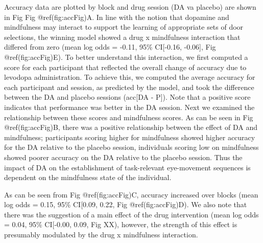 \documentclass{article}
\begin{document}
Accuracy data are plotted by block and drug session (DA va placebo) are
shown in Fig Fig @ref(fig:accFig)A. In line with the notion that
dopamine and mindfulness may interact to support the learning of
appropriate sets of door selections, the winning model showed a drug x
mindfulness interaction that differed from zero (mean log odds = -0.11,
95\% CI{[}-0.16, -0.06{]}, Fig @ref(fig:accFig)E). To better understand
this interaction, we first computed a score for each participant that
reflected the overall change of accuracy due to levodopa administration.
To achieve this, we computed the average accuracy for each participant
and session, as predicted by the model, and took the difference between
the DA and placebo sessions (acc{[}DA - P{]}). Note that a positive
score indicates that performance was better in the DA session. Next we
examined the relationship between these scores and mindfulness scores.
As can be seen in Fig @ref(fig:accFig)B, there was a positive
relationship between the effect of DA and mindfulness; participants
scoring higher for mindfulness showed higher accuracy for the DA
relative to the placebo session, individuals scoring low on mindfulness
showed poorer accuracy on the DA relative to the placebo session. Thus
the impact of DA on the establishment of task-relevant eye-movement
sequences is dependent on the mindfulness state of the individual.

As can be seen from Fig @ref(fig:accFig)C, accuracy increased over
blocks (mean log odds = 0.15, 95\% CI{[}0.09, 0.22, Fig
@ref(fig:accFig)D). We also note that there was the suggestion of a main
effect of the drug intervention (mean log odds = 0.04, 95\% CI{[}-0.00,
0.09, Fig XX), however, the strength of this effect is presumably
modulated by the drug x mindfulness interaction.
\end{document}
